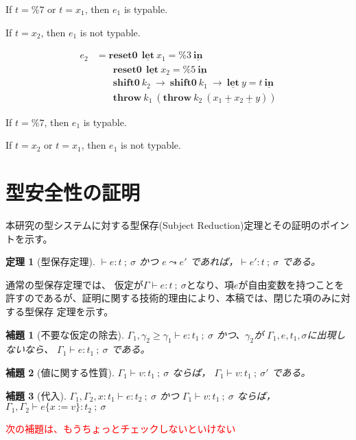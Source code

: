 \documentclass[T]{compsoft}
\newcommand\red[1]{\textcolor{red}{#1}}
\newcommand\Resetz{\textbf{reset0}}
\newcommand\Shiftz{\textbf{shift0}}
\newcommand\Throw{\textbf{throw}}
\newcommand\cPlus{\underline{\textbf{+}}}
\newcommand\cLet{\underline{\textbf{let}}}
\newcommand\cIn{\underline{\textbf{in}}}
\newcommand\csp[1]{\texttt{\%}{#1}}
\newcommand\ord{\ge}
\newcommand\lto{\leadsto}
\newcommand\kam[1]{\red{{#1}}}
\theoremstyle{break}
\newtheorem{theo}{定理}[section]
\newtheorem{lemm}{補題}[section]
\begin{document}
If $t=\csp{7}$ or $t=x_1$, then $e_1$ is typable.

If $t=x_2$, then $e_1$ is not typable.

\begin{align*}
  e_2 & = \Resetz ~~\cLet~x_1=\csp{3}~\cIn \\
      & \phantom{=}~~ \Resetz ~~\cLet~x_2=\csp{5}~\cIn \\
      & \phantom{=}~~ \Shiftz~k_2~\to~ \Shiftz~k_1~\to~ \cLet~y=t~\cIn \\
      & \phantom{=}~~ \Throw~k_1~(\Throw~k_2~(x_1~\cPlus~x_2~\cPlus~y))
\end{align*}

If $t=\csp{7}$, then $e_1$ is typable.

If $t=x_2$ or $t=x_1$, then $e_1$ is not typable.

\section{型安全性の証明}

本研究の型システムに対する型保存(Subject Reduction)定理とその証明のポイントを示す。

\begin{theo}[型保存定理]
$\vdash e:t~;~\sigma$ かつ $e \lto e'$ であれば，$\vdash e':t~;~\sigma$ である。
\end{theo}

通常の型保存定理では、
仮定が$\Gamma \vdash e:t~;~\sigma$となり、項$e$が自由変数を持つことを
許すのであるが、証明に関する技術的理由により、本稿では、閉じた項のみに対する型保存
定理を示す。

\begin{lemm}[不要な仮定の除去]
  $\Gamma_1,\gamma_2 \ord \gamma_1 \vdash e : t_1 ~;~\sigma$
  かつ、$\gamma_2$が $\Gamma_1, e, t_1, \sigma$に出現しないなら、
  $\Gamma_1 \vdash e : t_1 ~;~\sigma$ である。
\end{lemm}

\begin{lemm}[値に関する性質]
  $\Gamma_1 \vdash v : t_1 ~;~\sigma$
  ならば，
  $\Gamma_1 \vdash v : t_1 ~;~\sigma'$
  である。
\end{lemm}

\begin{lemm}[代入]
  $\Gamma_1, \Gamma_2, x : t_1 \vdash e : t_2 ~;~\sigma$
  かつ
  $\Gamma_1 \vdash v : t_1 ~;~\sigma$
  ならば，
  $\Gamma_1, \Gamma_2 \vdash e\{x := v\} : t_2~;~\sigma$
\end{lemm}

\kam{次の補題は、もうちょっとチェックしないといけない}
\end{document}
